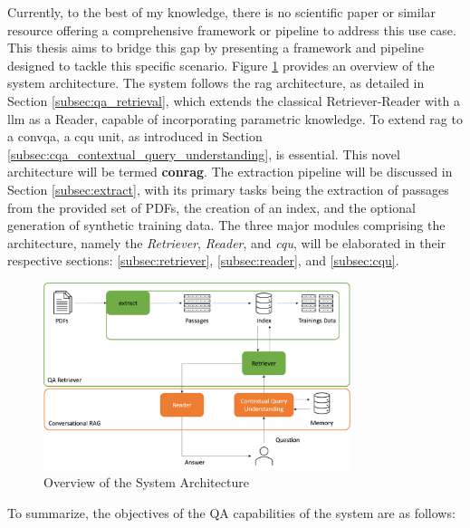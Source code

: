 Currently, to the best of my knowledge, there is no scientific paper or similar resource offering a comprehensive framework or pipeline to address this use case. This thesis aims to bridge this gap by presenting a framework and pipeline designed to tackle this specific scenario. Figure \ref{fig:overview-system-architecture} provides an overview of the system architecture. The system follows the \gls{rag} architecture, as detailed in Section \ref{subsec:qa_retrieval}, which extends the classical Retriever-Reader with a \gls{llm} as a Reader, capable of incorporating parametric knowledge. To extend \gls{rag} to a \gls{convqa}, a \gls{cqu} unit, as introduced in Section \ref{subsec:cqa_contextual_query_understanding}, is essential. This novel architecture will be termed \textbf{\gls{conrag}}. The extraction pipeline will be discussed in Section \ref{subsec:extract}, with its primary tasks being the extraction of passages from the provided set of PDFs, the creation of an index, and the optional generation of synthetic training data. The three major modules comprising the architecture, namely the \textit{Retriever}, \textit{Reader}, and \textit{\gls{cqu}}, will be elaborated in their respective sections: \ref{subsec:retriever}, \ref{subsec:reader}, and \ref{subsec:cqu}.

\begin{figure}
    \centering
    \includegraphics[width=0.8\textwidth]{Grafiken/System_Architecture.png}
    \caption{Overview of the System Architecture}
    \label{fig:overview-system-architecture}
\end{figure}

To summarize, the objectives of the QA capabilities of the system are as follows:

